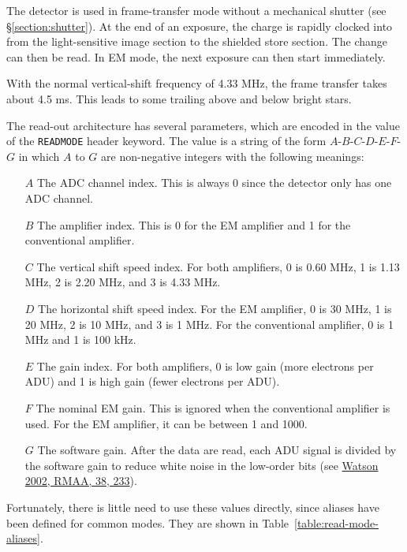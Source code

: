 The detector is used in frame-transfer mode without a mechanical shutter (see \S\ref{section:shutter}). At the end of an exposure, the charge is rapidly clocked into from the light-sensitive image section to the shielded store section. The change can then be read. In EM mode, the next exposure can then start immediately.

With the normal vertical-shift frequency of 4.33 MHz, the frame transfer takes about 4.5 ms. This leads to some trailing above and below bright stars.

The read-out architecture has several parameters, which are encoded in the value of the \verb|READMODE| header keyword. The value is a string of the form $A$-$B$-$C$-$D$-$E$-$F$-$G$ in which $A$ to $G$ are non-negative integers with the following meanings:

\begin{itemize}
\item[$A$] The ADC channel index. This is always 0 since the detector only has one ADC channel.
\item[$B$] The amplifier index. This is 0 for the EM amplifier and 1 for the conventional amplifier.
\item[$C$] The vertical shift speed index. For both amplifiers, 0 is 0.60 MHz, 1 is 1.13 MHz, 2 is 2.20 MHz, and 3 is 4.33 MHz. 
\item[$D$] The horizontal shift speed index. For the EM amplifier, 0 is 30 MHz, 1 is 20 MHz, 2 is 10 MHz, and 3 is 1 MHz. For the conventional amplifier, 0 is 1 MHz and 1 is 100 kHz.
\item[$E$] The gain index. For both amplifiers, 0 is low gain (more electrons per ADU) and 1 is high gain (fewer electrons per ADU).
\item[$F$] The nominal EM gain. This is ignored when the conventional amplifier is used. For the EM amplifier, it can be between 1 and 1000.
\item[$G$] The software gain. After the data are read, each ADU signal is divided by the software gain to reduce white noise in the low-order bits (see \href{https://ui.adsabs.harvard.edu/abs/2002RMxAA..38..233W/abstract}{Watson 2002, RMAA, 38, 233}).
\end{itemize}

Fortunately, there is little need to use these values directly, since aliases have been defined for common modes. They are shown in Table~\ref{table:read-mode-aliases}.

